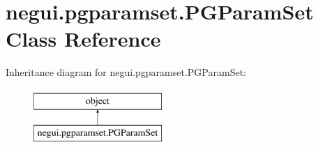 \hypertarget{classnegui_1_1pgparamset_1_1PGParamSet}{}\section{negui.\+pgparamset.\+P\+G\+Param\+Set Class Reference}
\label{classnegui_1_1pgparamset_1_1PGParamSet}
Inheritance diagram for negui.\+pgparamset.\+P\+G\+Param\+Set\+:\begin{figure}[H]
\begin{center}
\leavevmode
\includegraphics[height=2.000000cm]{classnegui_1_1pgparamset_1_1PGParamSet}
\end{center}
\end{figure}
